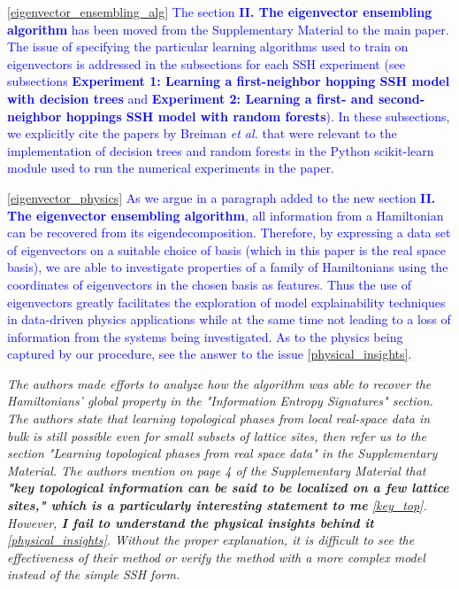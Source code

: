 \documentclass[10pt]{revtex4-1}
\newcounter{quoter}
\newcommand{\genquote}[1]{\refstepcounter{quoter} \label{#1} \ref{#1}}
\newcommand{\citequote}[1]{\ref{#1}}
\begin{document}
\vspace{0.25cm}
\textcolor{blue}{\citequote{eigenvector_ensembling_alg}  The section \textbf{II. The eigenvector ensembling algorithm} has been moved from the Supplementary Material to the main paper. The issue of specifying the particular learning algorithms used to train on eigenvectors is addressed in the subsections for each SSH experiment (see subsections \textbf{Experiment 1: Learning a first-neighbor hopping SSH model with decision trees} and \textbf{Experiment 2: Learning a first- and second-neighbor hoppings SSH model with random forests}). In these subsections, we explicitly cite the papers by Breiman \emph{et al.} that were relevant to the implementation of decision trees and random forests in the Python scikit-learn module used to run the numerical experiments in the paper.}

\textcolor{blue}{\citequote{eigenvector_physics} As we argue in a paragraph added to the new section \textbf{II. The eigenvector ensembling algorithm},  all information from a Hamiltonian can be recovered from its eigendecomposition. Therefore, by expressing a data set of eigenvectors on a suitable choice of basis (which in this paper is the real space basis), we are able to investigate properties of a family of Hamiltonians using the coordinates of eigenvectors in the chosen basis as features. Thus the use of eigenvectors greatly facilitates the exploration of model explainability techniques in data-driven physics applications while at the same time not leading to a loss of information from the systems being investigated. As to the physics being captured by our procedure, see the answer to the issue \citequote{physical_insights}.} 

\vspace{0.5cm}
\emph{The authors made efforts to analyze how the algorithm was able to recover the Hamiltonians' global property in the "Information Entropy
Signatures" section. The authors state that learning topological phases from local real-space data in bulk is still possible even for
small subsets of lattice sites, then refer us to the section "Learning topological phases from real space data" in the Supplementary
Material. The authors mention on page 4 of the Supplementary Material that \textbf{"key topological information can be said to be localized on a few lattice sites," which is a particularly interesting statement to me}\genquote{key_top}. However, \textbf{I fail to understand the physical insights behind it}\genquote{physical_insights}. Without the proper explanation, it is difficult to see the effectiveness of
their method or verify the method with a more complex model instead of the simple SSH form.}
\end{document}

